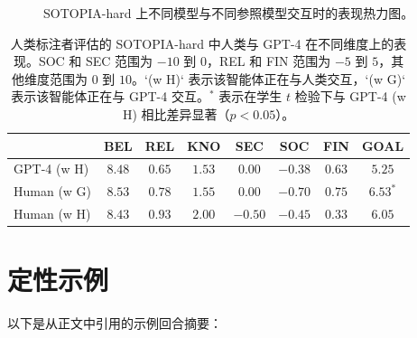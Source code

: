 \documentclass[11pt,a4paper]{article}
\begin{document}
\begin{figure}[htbp]
\centering
{}
\caption{SOTOPIA-hard 上不同模型与不同参照模型交互时的表现热力图。}
\label{fig:g5modeloverall}
\end{figure}

\begin{table}[htbp]
\centering
\small
\begin{tabular}{lccccccc}
\toprule
 & BEL & REL & KNO & SEC & SOC & FIN & GOAL \\
\midrule
GPT-4 (w H) & $8.48$ & $0.65$ & $1.53$ & $0.00$ & $-0.38$ & $0.63$ & $5.25$ \\
Human (w G) & $8.53$ & $0.78$ & $1.55$ & $0.00$ & $-0.70$ & $0.75$ & $6.53^{*}$ \\
Human (w H) & $8.43$ & $0.93$ & $2.00$ & $-0.50$ & $-0.45$ & $0.33$ & $6.05$ \\
\bottomrule
\end{tabular}
\caption{人类标注者评估的 SOTOPIA-hard 中人类与 GPT-4 在不同维度上的表现。SOC 和 SEC 范围为 $-10$ 到 $0$，REL 和 FIN 范围为 $-5$ 到 $5$，其他维度范围为 $0$ 到 $10$。`(w H)` 表示该智能体正在与人类交互，`(w G)` 表示该智能体正在与 GPT-4 交互。$^{*}$ 表示在学生 $t$ 检验下与 GPT-4 (w H) 相比差异显著（$p < 0.05$）。}
\label{tab:humanevalhard}
\end{table}

\section{定性示例}
\label{app:qualitative}

以下是从正文中引用的示例回合摘要：
\end{document}
